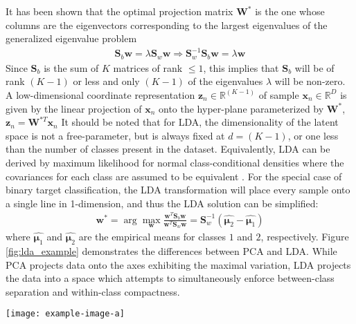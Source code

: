 It has been shown that the optimal projection matrix $\bm{W}^{*}$ is the one whose columns are the eigenvectors corresponding to the largest eigenvalues of the generalized eigenvalue problem 
\begin{align}
	\bm{S}_{b}\bm{w}=\lambda \bm{S}_{w}\bm{w} \Rightarrow \bm{S}_{w}^{-1}\bm{S}_{b}\bm{w} = \lambda\bm{w}
\end{align}
Since $\bm{S}_{b}$ is the sum of $K$ matrices of rank $\leq 1$, this implies that $\bm{S}_{b}$ will be of rank $(K-1)$ or less and only $(K-1)$ of the eigenvalues $\lambda$ will be non-zero.  
A low-dimensional coordinate representation $\bm{z}_{n} \in \mathbb{R}^{(K-1)}$ of sample $\bm{x}_{n} \in \mathbb{R}^{D}$ is given by the linear projection of $\bm{x}_{n}$ onto the hyper-plane parameterized by $\bm{W}^{*}$, $\bm{z}_{n} = \bm{W}^{*T}\bm{x}_{n}$  It should be noted that for LDA, the dimensionality of the latent space is not a free-parameter, but is always fixed at $d=(K-1)$, or one less than the number of classes present in the dataset.  Equivalently, LDA can be derived by maximum likelihood for normal class-conditional densities where the covariances for each class are assumed to be equivalent \citep{Murphy2012}.  For the special case of binary target classification, the LDA transformation will place every sample onto a single line in 1-dimension, and thus the LDA solution can be simplified:
\begin{align}
	\bm{w}^{*} = \arg\max_{\bm{w}} \frac{\bm{w}^{T}\bm{S}_{b}\bm{w}}{\bm{w}^{T}\bm{S}_{w}\bm{w}} = \bm{S}_{w}^{-1}(\hat{\bm{\mu}_{2}} - \hat{\bm{\mu}_{1}})
\end{align}  
where $\hat{\bm{\mu}_{1}}$ and $\hat{\bm{\mu}_{2}}$ are the empirical means for classes $1$ and $2$, respectively.  Figure \ref{fig:lda_example} demonstrates the differences between PCA and LDA.  While PCA projects data onto the axes exhibiting the maximal variation, LDA projects the data into a space which attempts to simultaneously enforce between-class separation and within-class compactness. 

\begin{center}
	\begin{figure*}[h]
		\centering
		\texttt{[image: example-image-a]}
		\caption[LDA example.]{LDA example.}
		\label{fig:lda_example}
	\end{figure*}
\end{center}

